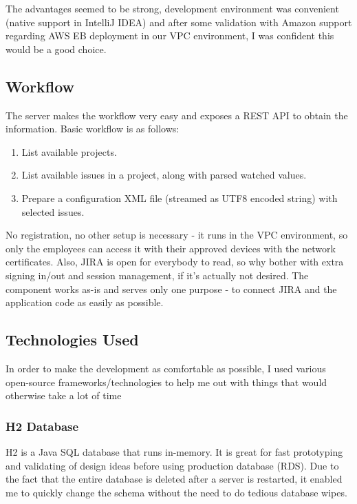 The advantages seemed to be strong, development environment was convenient (native support in IntelliJ IDEA) and after some validation with Amazon support regarding AWS EB deployment in our VPC environment, I was confident this would be a good choice.

\subsection{Workflow}

The server makes the workflow very easy and exposes a REST API to obtain the information. Basic workflow is as follows:

\begin{enumerate}
	\item List available projects.
	\item List available issues in a project, along with parsed watched values.
	\item Prepare a configuration XML file (streamed as UTF8 encoded string) with selected issues.
\end{enumerate}

No registration, no other setup is necessary - it runs in the VPC environment, so only the employees can access it with their approved devices with the network certificates. Also, JIRA is open for everybody to read, so why bother with extra signing in/out and session management, if it's actually not desired. The component works as-is and serves only one purpose - to connect JIRA and the application code as easily as possible.

\newpage

\subsection{Technologies Used}

In order to make the development as comfortable as possible, I used various open-source frameworks/technologies to help me out with things that would otherwise take a lot of time

\subsubsection{H2 Database}

H2 is a Java SQL database that runs in-memory. It is great for fast prototyping and validating of design ideas before using production database (RDS). Due to the fact that the entire database is deleted after a server is restarted, it enabled me to quickly change the schema without the need to do tedious database wipes. 

